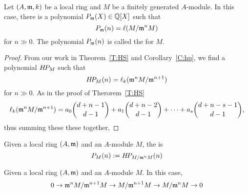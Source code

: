 \documentclass{ximera}
\begin{document}
\begin{proposition}
  Let $(A,\mathfrak{m},k)$ be a local ring and $M$ be a finitely generated
  $A$-module. In this case, there is a polynomial $P_{\mathfrak{m}}(X)\in\mathbb Q[X]$
  such that
  \[
  P_{\mathfrak{m}}(n) = \ell(M/\mathfrak{m}^n M)
  \]
  for $n\gg 0$. The polynomial $P_{\mathfrak{m}}(n)$ is called the  for $M$.
  \begin{proof}
    From our work in Theorem~\ref{T:HS} and Corollary~\ref{C:hp}, we
    find a polynomial $H\!P_M$ such that
    \[
    H\!P_M(n) = \ell_{k}(\mathfrak{m}^n M/\mathfrak{m}^{n+1}) 
    \]
    for $n\gg 0$. As in the proof of Therorem~\ref{T:HS}
    \[
    \ell_k(\mathfrak{m}^n M/\mathfrak{m}^{n+1}) = a_0 \binom{d+n-1}{d-1} + a_1 \binom{d+n-2}{d-1} + \dots + a_s \binom{d+n-s-1}{d-1},
    \]
    thus summing these these together, 






    
  \end{proof}
\end{proposition}


\begin{definition}
  Given a local ring $(A,\mathfrak{m})$ and an $A$-module $M$, the
   is
  \[
  P_M(n) := H\!P_{M/\mathfrak{m}^n M}(n)
  \]
\end{definition}



\begin{proposition}
  Given a local ring $(A,\mathfrak{m})$ and an $A$-module $M$. In this case,
  \[
  0 \to \mathfrak{m}^n M/\mathfrak{m}^{n+1}M \to M/\mathfrak{m}^{n+1}M \to M/\mathfrak{m}^n M \to 0
  \]
\end{proposition}





\begin{theorem}
  
\end{theorem}
\end{document}
